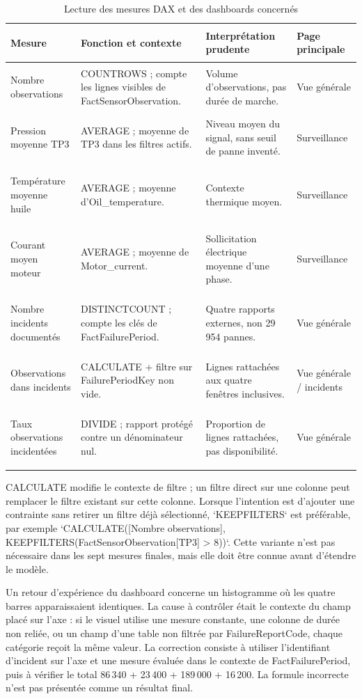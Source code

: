 \begin{table}[H]
\centering
\small
\setlength{\tabcolsep}{3pt}
\caption{Lecture des mesures DAX et des dashboards concernés}
\label{tab:dax-reading}
\begin{tabularx}{\textwidth}{>{\bfseries\raggedright\arraybackslash}p{3.0cm} >{\raggedright\arraybackslash}X >{\raggedright\arraybackslash}X >{\raggedright\arraybackslash}p{2.2cm}}
\toprule
Mesure & Fonction et contexte & Interprétation prudente & Page principale\\
\midrule
Nombre observations & COUNTROWS ; compte les lignes visibles de FactSensorObservation. & Volume d'observations, pas durée de marche. & Vue générale\\
Pression moyenne TP3 & AVERAGE ; moyenne de TP3 dans les filtres actifs. & Niveau moyen du signal, sans seuil de panne inventé. & Surveillance\\
Température moyenne huile & AVERAGE ; moyenne d'Oil\_temperature. & Contexte thermique moyen. & Surveillance\\
Courant moyen moteur & AVERAGE ; moyenne de Motor\_current. & Sollicitation électrique moyenne d'une phase. & Surveillance\\
Nombre incidents documentés & DISTINCTCOUNT ; compte les clés de FactFailurePeriod. & Quatre rapports externes, non 29\,954 pannes. & Vue générale\\
Observations dans incidents & CALCULATE + filtre sur FailurePeriodKey non vide. & Lignes rattachées aux quatre fenêtres inclusives. & Vue générale / incidents\\
Taux observations incidentées & DIVIDE ; rapport protégé contre un dénominateur nul. & Proportion de lignes rattachées, pas disponibilité. & Vue générale\\
\bottomrule
\end{tabularx}
\normalsize
\setlength{\tabcolsep}{6pt}
\end{table}

CALCULATE modifie le contexte de filtre ; un filtre direct sur une colonne peut remplacer le filtre existant sur cette colonne. Lorsque l'intention est d'ajouter une contrainte sans retirer un filtre déjà sélectionné, `KEEPFILTERS` est préférable, par exemple `CALCULATE([Nombre observations], KEEPFILTERS(FactSensorObservation[TP3] > 8))`. Cette variante n'est pas nécessaire dans les sept mesures finales, mais elle doit être connue avant d'étendre le modèle.

Un retour d'expérience du dashboard concerne un histogramme où les quatre barres apparaissaient identiques. La cause à contrôler était le contexte du champ placé sur l'axe : si le visuel utilise une mesure constante, une colonne de durée non reliée, ou un champ d'une table non filtrée par FailureReportCode, chaque catégorie reçoit la même valeur. La correction consiste à utiliser l'identifiant d'incident sur l'axe et une mesure évaluée dans le contexte de FactFailurePeriod, puis à vérifier le total 86\,340 + 23\,400 + 189\,000 + 16\,200. La formule incorrecte n'est pas présentée comme un résultat final.
